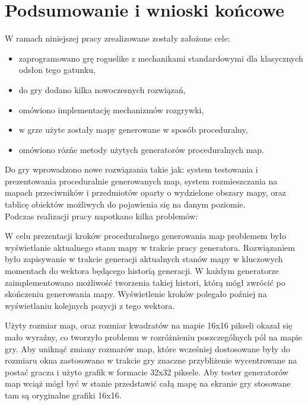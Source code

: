 \documentclass[12pt,twoside]{article}
\begin{document}
\section{Podsumowanie i wnioski końcowe}

W ramach niniejszej pracy zrealizowane zostały założone cele: 
\begin{itemize}
	\item zaprogramowano grę roguelike z mechanikami standardowymi dla klasycznych odsłon tego gatunku,
	\item do gry dodano kilka nowoczesnych rozwiązań,
	\item omówiono implementację mechanizmów rozgrywki,
	\item w grze użyte zostały mapy generowane w sposób proceduralny,
	\item omówiono rózńe metody użytych generatorów proceduralnych map.
\end{itemize}

Do gry wprowadzono nowe rozwiązania takie jak: system testowania i prezentowania proceduralnie generowanych map, system rozmieszczania na mapach przeciwników i przedmiotów oparty o wydzielone obszary mapy, oraz tablicę obiektów możliwych do pojawienia się na danym poziomie.
\\

Podczas realizacji pracy napotkano kilka problemów:

W celu prezentacji kroków proceduralnego generowania map problemem było wyświetlanie aktualnego stanu mapy w trakcie pracy generatora. Rozwiązaniem było zapisywanie w trakcie generacji aktualnych stanów mapy w kluczowych momentach do wektora będącego historią generacji. W każdym generatorze zaimplementowano możliwość tworzenia takiej histori, którą mógł zwrócić po skończeniu generowania mapy. Wyświetlenie kroków polegało poźniej na wyświetlaniu kolejnych pozycji z tego wektora.

Użyty rozmiar map, oraz rozmiar kwadratów na mapie 16x16 pikseli okazał się mało wyraźny, co tworzyło problemu w rozróżnieniu poszczególnych pól na mapie gry. Aby uniknąć zmiany rozmarów map, które wcześniej dostosowane były do rozmiaru okna zastosowano w trakcie gry znaczne przybliżenie wycentrowane na postać gracza i użyto grafik w formacie 32x32 piksele. Aby tester generatorów map wciąż mógł być w stanie przedstawić całą mapę na ekranie gry stosowane tam są oryginalne grafiki 16x16. \\
\end{document}
